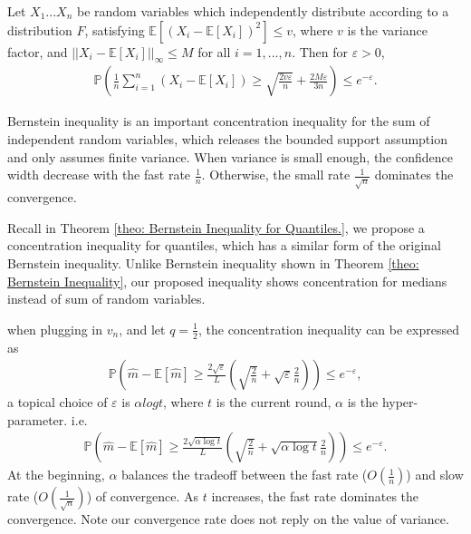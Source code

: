 \begin{theo} 
\label{theo: Bernstein Inequality}
Let $X_{1} ... X_{n}$ be random variables which independently distribute according to a distribution $F$, satisfying $\mathbb{E}[(X_i - \mathbb{E}[X_i])^2] \leq v$, where $v$ is the variance factor, and ${||X_i - \mathbb{E}[X_i]||}_{\infty} \leq M$ for all $i = 1, ..., n$. Then for $\varepsilon > 0$, 
\begin{align}
    \mathbb{P}(\frac{1}{n} \sum_{i = 1}^n (X_i - \mathbb{E}[X_i]) \geq \sqrt{\frac{2 v \varepsilon}{n}}+ \frac{2 M \varepsilon}{3n}) \leq e^{-\varepsilon}.
\end{align}
\end{theo}

Bernstein inequality is an important concentration inequality for the sum of independent random variables, which releases the bounded support assumption and only assumes finite variance. When variance is small enough, the confidence width decrease with the fast rate $\frac{1}{n}$. Otherwise, the small rate $\frac{1}{\sqrt{n}}$ dominates the convergence.

Recall in Theorem \ref{theo: Bernstein Inequality for Quantiles.}, we propose a concentration inequality for quantiles, which has a similar form of the original Bernstein inequality. Unlike Bernstein inequality shown in Theorem \ref{theo: Bernstein Inequality}, our proposed inequality shows concentration for medians instead of sum of random variables.

\BernQuant*

when plugging in $v_n$, and let $q = \frac{1}{2}$, the concentration inequality can be expressed as 
\begin{align}
    \mathbb{P}\left(\hat{m} - \mathbb{E}[\hat{m}] \geq \frac{2 \sqrt{\varepsilon}}{L}\left(\sqrt{\frac{2}{n}} + \sqrt{\varepsilon} \frac{2}{n}\right)\right) \leq  e^{- \varepsilon},
\end{align}
a topical choice of $\varepsilon$ is $\alpha log t$, where $t$ is the current round, $\alpha$ is the hyper-parameter. i.e.
\begin{align}
    \mathbb{P}\left(\hat{m} - \mathbb{E}[\hat{m}] \geq \frac{2 \sqrt{\alpha \log t}}{L}\left(\sqrt{\frac{2}{n}} + \sqrt{\alpha \log t} \frac{2}{n}\right)\right) \leq  e^{- \varepsilon}.
\end{align}
At the beginning, $\alpha$ balances the tradeoff between the fast rate ($O(\frac{1}{n})$) and slow rate ($O(\frac{1}{\sqrt{n}})$) of convergence. As $t$ increases, the fast rate dominates the convergence. Note our convergence rate does not reply on the value of variance.  

